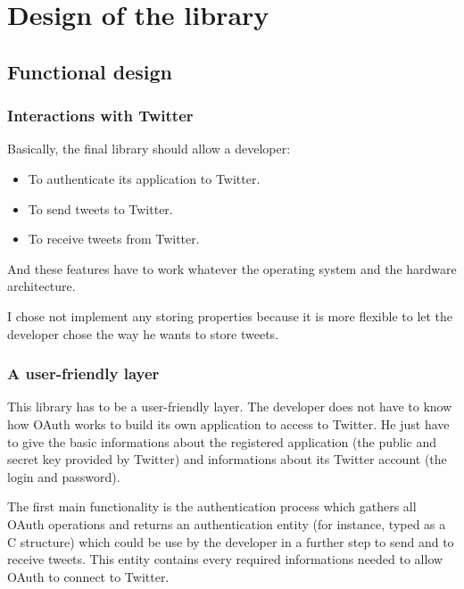\chapter{Design of the library}


\section{Functional design}

\subsection{Interactions with Twitter}

\hspace{15mm}Basically, the final library should allow a developer:
\begin{itemize}
\item To authenticate its application to Twitter. 
\item To send tweets to Twitter.
\item To receive tweets from Twitter.
\end{itemize}

And these features have to work whatever the operating system and the hardware architecture.

I chose not implement any storing properties because it is more flexible to let the developer chose the way he wants to store tweets.


\subsection{A user-friendly layer}

\hspace{15mm}This library has to be a user-friendly layer. The developer does not have to know how OAuth works to build its own application to access to Twitter. He just have to give the basic informations about the registered application (the public and secret key provided by Twitter) and informations about its Twitter account (the login and password).

The first main functionality is the authentication process which gathers all OAuth operations and returns an authentication entity (for instance, typed as a C structure) which could be use by the developer in a further step to send and to receive tweets. This entity contains every required informations needed to allow OAuth to connect to Twitter. 


